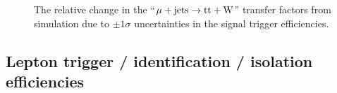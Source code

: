 \begin{figure}[!h]
{  } \\
   ~
   \\
  \caption{\label{fig:tfSyst_trigger_muToTtw} The relative change in the
    ``$\mu + \textrm{jets} \rightarrow \mathrm{tt+W}$'' transfer factors from
    simulation due to $\pm1\sigma$ uncertainties in the signal trigger
    efficiencies.  }
\end{figure}

\clearpage
\subsection{Lepton trigger / identification / isolation efficiencies}


